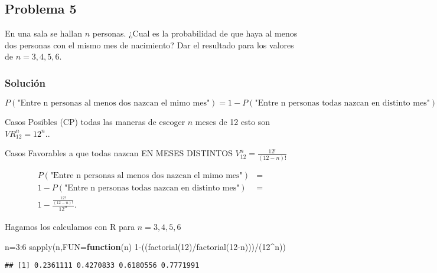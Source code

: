 \documentclass[
]{article}
\newenvironment{Shaded}{\begin{snugshade}}{\end{snugshade}}
\newcommand{\AttributeTok}[1]{\textcolor[rgb]{0.77,0.63,0.00}{#1}}
\newcommand{\ControlFlowTok}[1]{\textcolor[rgb]{0.13,0.29,0.53}{\textbf{#1}}}
\newcommand{\DecValTok}[1]{\textcolor[rgb]{0.00,0.00,0.81}{#1}}
\newcommand{\FunctionTok}[1]{\textcolor[rgb]{0.00,0.00,0.00}{#1}}
\newcommand{\NormalTok}[1]{#1}
\newcommand{\OtherTok}[1]{\textcolor[rgb]{0.56,0.35,0.01}{#1}}
\newcommand{\SpecialCharTok}[1]{\textcolor[rgb]{0.00,0.00,0.00}{#1}}
\begin{document}
\hypertarget{problema-5}{%
\subsection{Problema 5}\label{problema-5}}

En una sala se hallan \(n\) personas. ¿Cual es la probabilidad de que
haya al menos dos personas con el mismo mes de nacimiento? Dar el
resultado para los valores de \(n=3,4,5,6\).

\hypertarget{soluciuxf3n-5}{%
\subsubsection{Solución}\label{soluciuxf3n-5}}

\[P(\mbox{"Entre n personas al menos dos nazcan el mimo mes"})=1-P(\mbox{"Entre  n personas todas nazcan en distinto mes"}).\]

Casos Posibles (CP) todas las maneras de escoger \(n\) meses de 12 esto
son \(VR_{12}^n=12^n.\).

Casos Favorables a que todas nazcan EN MESES DISTINTOS
\(V_{12}^n=\frac{12!}{(12-n)!}\)

\begin{eqnarray*}
P(\mbox{"Entre n personas al menos dos nazcan el mimo mes"})&=&\\
1-P(\mbox{"Entre  n personas todas nazcan en distinto mes"})&=&\\
1-\frac{\frac{12!}{(12-n)!}}{12^n}.
\end{eqnarray*}

Hagamos los calculamos con R para \(n=3,4,5,6\)

\begin{Shaded}
\begin{Highlighting}[]
\NormalTok{n}\OtherTok{=}\DecValTok{3}\SpecialCharTok{:}\DecValTok{6}
\FunctionTok{sapply}\NormalTok{(n,}\AttributeTok{FUN=}\ControlFlowTok{function}\NormalTok{(n) }\DecValTok{1}\SpecialCharTok{{-}}\NormalTok{((}\FunctionTok{factorial}\NormalTok{(}\DecValTok{12}\NormalTok{)}\SpecialCharTok{/}\FunctionTok{factorial}\NormalTok{(}\DecValTok{12}\SpecialCharTok{{-}}\NormalTok{n)))}\SpecialCharTok{/}\NormalTok{(}\DecValTok{12}\SpecialCharTok{\^{}}\NormalTok{n))}
\end{Highlighting}
\end{Shaded}

\begin{verbatim}
## [1] 0.2361111 0.4270833 0.6180556 0.7771991
\end{verbatim}
\end{document}
